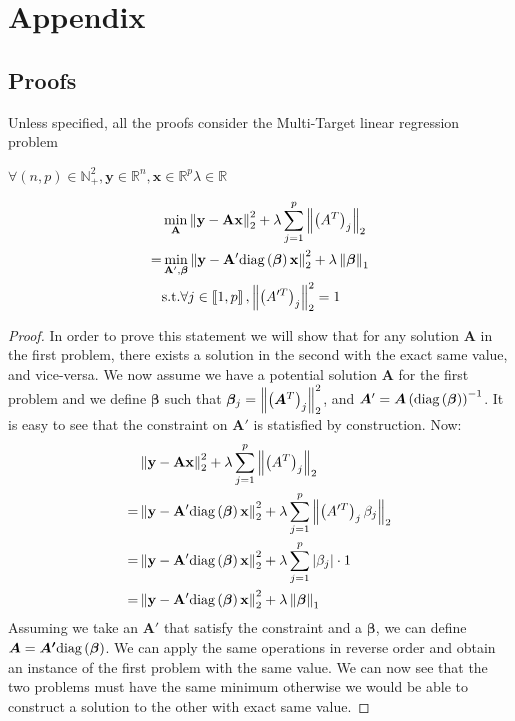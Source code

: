 \section{Appendix}
\subsection{Proofs}
Unless specified, all the proofs consider the Multi-Target linear regression problem
\begin{proposition}
\label{gps_equivalence}
  $\forall (n, p) \in \mathbb{N}_+^2, \bm{y} \in \mathbb{R}^{n}, \bm{x} \in \mathbb{R}^{p} \lambda \in \mathbb{R}$
  
  \begin{align*}
    & \min_{\bf{A}} \left\lVert\bf{y} - \bf{A}\bf{x}\right\rVert_2^2 + \lambda \sum_{j=1}^p \left\lVert\left(A^T\right)_j\right\rVert_2 \\
     = &\min_{\bf{A'}, \bm{\beta}} \left\lVert\bf{y} - \bf{A'}\text{diag}\left(\bm{\beta}\right)\bf{x}\right\rVert_2^2 + \lambda \left\lVert\bm{\beta}\right\rVert_1 \\
     & \text{s.t.} \forall j \in \left\llbracket1, p\right\rrbracket, \left\lVert\left(A'^T\right)_j\right\rVert_2^2 = 1
  \end{align*}
\end{proposition}

\begin{proof}
  In order to prove this statement we will show that for any solution $\bm{A}$ in the first problem, there exists a solution in the second with the exact same value, and vice-versa.
We now assume we have a potential solution $\bm{A}$ for the first problem and we define $\bm{\beta}$ such that $\bm{\beta}_j = \left\lVert\left(\bm{A}^T\right)_j\right\rVert_2^2$, and $\bm{A}' = \bm{A}\left(\text{diag}\left(\bm{\beta}\right)\right)^{-1}$. It is easy to see that the constraint on $\bm{A}'$ is statisfied by construction. Now:
  \begin{align*}
    & \left\lVert\bf{y} - \bf{A}\bf{x}\right\rVert_2^2 + \lambda \sum_{j=1}^p \left\lVert\left(A^T\right)_j\right\rVert_2 \\
    = &\left\lVert\bf{y} - \bf{A'}\text{diag}\left(\bm{\beta}\right)\bf{x}\right\rVert_2^2 + \lambda \sum_{j=1}^p \left\lVert\left(A'^T\right)_j\beta_j\right\rVert_2 \\
    = &\left\lVert\bf{y} - \bf{A'}\text{diag}\left(\bm{\beta}\right)\bf{x}\right\rVert_2^2 + \lambda \sum_{j=1}^p \left|\beta_j\right| \cdot 1\\
    = &\left\lVert\bf{y} - \bf{A'}\text{diag}\left(\bm{\beta}\right)\bf{x}\right\rVert_2^2 + \lambda \left\lVert\bm{\beta}\right\rVert_1
  \end{align*}
  Assuming we take an $\bm{A}'$ that satisfy the constraint and a $\bm{\beta}$, we can define $\bm{A} = \bm{A'}\text{diag}\left(\bm{\beta}\right)$. We can apply the same operations in reverse order and obtain an instance of the first problem with the same value. We can now see that the two problems must have the same minimum otherwise we would be able to construct a solution to the other with exact same value.
\end{proof}

